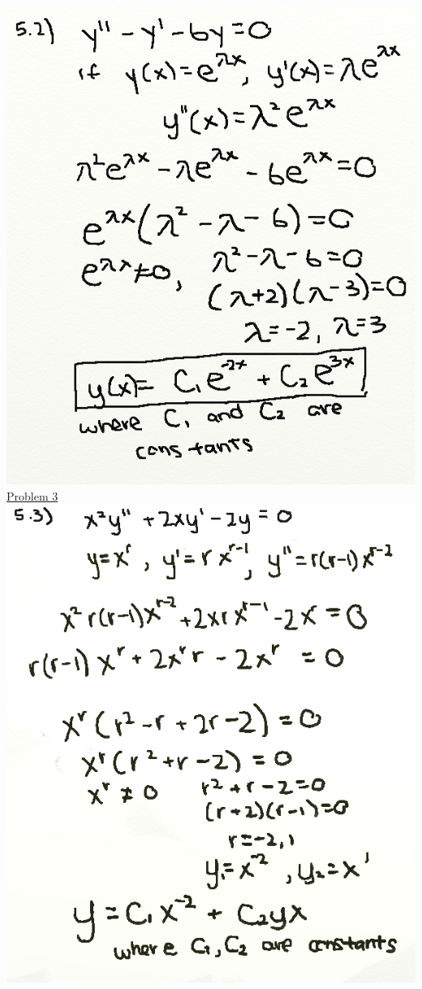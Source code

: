\documentclass{article}
\begin{document}
\includegraphics[width=\textwidth,height=\textheight,keepaspectratio]{ams362.png}\clearpage{}
\underline{Problem 3}\newline{}
\includegraphics[width=\textwidth,height=\textheight,keepaspectratio]{ams3633.png}\clearpage{}
\end{document}
